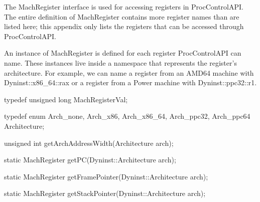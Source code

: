 
The MachRegister interface is used for accessing registers in
ProcControlAPI. The entire definition of MachRegister contains more register
names than are listed here; this appendix only lists the registers that can be
accessed through ProcControlAPI.

An instance of MachRegister is defined for each register ProcControlAPI can
name. These instances live inside a namespace that represents the
register's architecture. For example, we can name a
register from an AMD64 machine with Dyninst::x86\_64::rax or a register from a
Power machine with Dyninst::ppc32::r1.


\begin{apient}
typedef unsigned long MachRegisterVal;
\end{apient}


\begin{apient}
typedef enum { Arch_none, Arch_x86, Arch_x86_64, Arch_ppc32, Arch_ppc64 } Architecture;
\end{apient}


\begin{apient}
unsigned int getArchAddressWidth(Architecture arch);
\end{apient}


\begin{apient}
static MachRegister getPC(Dyninst::Architecture arch);
\end{apient}


\begin{apient}
static MachRegister getFramePointer(Dyninst::Architecture arch);
\end{apient}


\begin{apient}
static MachRegister getStackPointer(Dyninst::Architecture arch);
\end{apient}

